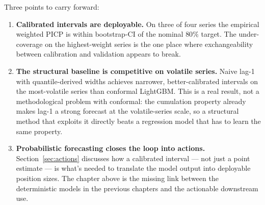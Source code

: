 Three points to carry forward:

\begin{enumerate}
  \item \textbf{Calibrated intervals are deployable.} On three of four series the empirical weighted PICP is within bootstrap-CI of the nominal $80\%$ target. The under-coverage on the highest-weight series is the one place where exchangeability between calibration and validation appears to break.
  \item \textbf{The structural baseline is competitive on volatile series.} Naive lag-1 with quantile-derived widths achieves narrower, better-calibrated intervals on the most-volatile series than conformal LightGBM. This is a real result, not a methodological problem with conformal: the cumulation property already makes lag-1 a strong forecast at the volatile-series scale, so a structural method that exploits it directly beats a regression model that has to learn the same property.
  \item \textbf{Probabilistic forecasting closes the loop into actions.} Section~\ref{sec:actions} discusses how a calibrated interval --- not just a point estimate --- is what's needed to translate the model output into deployable position sizes. The chapter above is the missing link between the deterministic models in the previous chapters and the actionable downstream use.
\end{enumerate}
